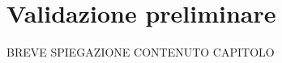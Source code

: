 \chapter{Validazione preliminare} %
%

\begin{citazione}
BREVE SPIEGAZIONE CONTENUTO CAPITOLO
\end{citazione}

\newpage
